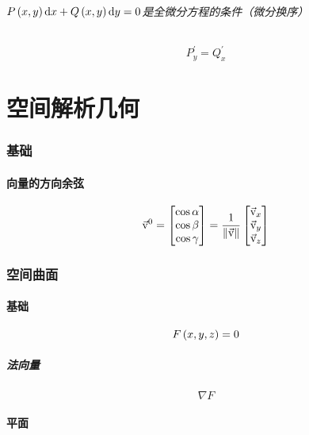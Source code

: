 \documentclass{article}
\begin{document}
\paragraph{$P\left(x,y\right)\mathrm d x+Q\left(x,y\right)\mathrm d y=0$是全微分方程的条件（微分换序）}

\[P_y^\prime=Q_x^\prime\]

\part{空间解析几何}

\section{基础}

\subsection{向量的方向余弦}

\[\vec{\mathrm v}^0=
    \begin{bmatrix}
        \cos\alpha \\
        \cos\beta  \\
        \cos\gamma
    \end{bmatrix}=
    \frac1{\left\Vert\vec{\mathrm v}\right\Vert}
    \begin{bmatrix}\vec{\mathrm v}_x\\\vec{\mathrm v}_y\\\vec{\mathrm v}_z\end{bmatrix}\]

\section{空间曲面}

\subsection{基础}

\begin{definition}[]
    \[F\left(x,y,z\right)=0\]
\end{definition}

\subsubsection{法向量}

\[\nabla F\]

\subsection{平面}
\end{document}
